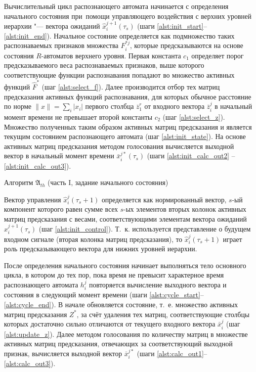 Вычислительный цикл распознающего автомата начинается с определения начального состояния при~помощи управляющего воздействия с верхних уровней иерархии "--- вектора ожиданий $\hat x_i^{j+1}(\tau_s)$ (шаги \ref{alst:init_start}--\ref{alst:init_end}). Начальное состояние определяется как подмножество таких распознаваемых признаков множества $F_i^{*j}$, которые предсказываются на основе состояния $R$-автоматов верхнего уровня. Первая константа $c_1$ определяет порог предсказываемого веса распознаваемых признаков, выше которого соответствующие функции распознавания попадают во множество активных функций $\hat F^*$ (шаг \ref{alst:select_f}). Далее производится отбор тех матриц предсказания активных функций распознавания, для которых обычное расстояние по норме $\|x\|=\sum_i |x_i|$ первого столбца $\bar z_1^r$ от входного вектора $\bar z_i^j$ в начальный момент времени не превышает второй константы $c_2$ (шаг \ref{alst:select_z}). Множество полученных таким образом активных матриц предсказания и является текущим состоянием распознающего автомата (шаг \ref{alst:init_state}). На основе активных матриц предсказания методом голосования вычисляется выходной вектор в начальный момент времени $\bar x_i^{j*}(\tau_s)$ (шаги \ref{alst:init_calc_out2} -- \ref{alst:init_calc_out3}).

\begin{algorithm}[h]
	\caption{Алгоритм $\mathfrak{A}_{th}$ (часть I, задание начального состояния)}\label{alg:th_init}
	\begin{algorithmic}[1]
		
	\end{algorithmic}
\end{algorithm}
	
Вектор управления $\hat x_i^j(\tau_s+1)$ определяется как нормированный вектор, $s$-ый компонент которого равен сумме всех $s$-ых элементов вторых колонок активных матриц предсказания с весами, соответствующими элементам вектора ожиданий $\hat x_i^{j+1}(\tau_s)$ (шаг \ref{alst:init_control}). Т.~к. используется представление о будущем входном сигнале (вторая колонка матриц предсказания), то $\hat x_i^j(\tau_s+1)$ играет роль предсказывающего вектора для нижних уровней иерархии.

После определения начального состояния начинает выполняться тело основного цикла, в котором до тех пор, пока время не превысит характерное время распознающего автомата $h_i^j$ повторяется вычисление выходного вектора и состояния в следующий момент времени (шаги \ref{alst:cycle_start}--\ref{alst:cycle_end}). В начале обновляется состояние, т.~е. множество активных матриц предсказания $Z^*$, за счёт удаления тех матриц, соответствующие столбцы которых достаточно сильно отличаются от текущего входного вектора $\bar x_i^j$ (шаг \ref{alst:update_z}). Далее методом голосования по количеству матриц в множестве активных матриц предсказания, отвечающих за соответствующий выходной признак, вычисляется выходной вектор $\bar x_i^{j*}$ (шаги \ref{alst:calc_out1}--\ref{alst:calc_out3}).

